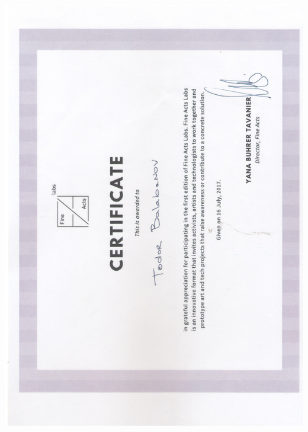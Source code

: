 \documentclass[bulgarian,a4paper]{europasscv}
\begin{document}
\includegraphics[width=\textwidth,height=\textheight,keepaspectratio]{FineActsLabs2017}
\end{document}
